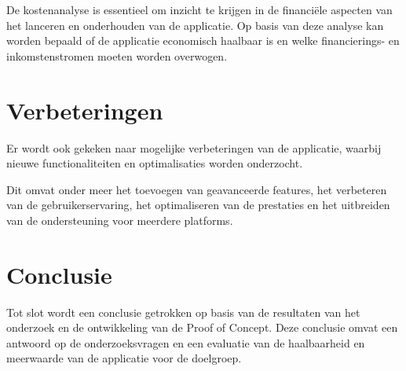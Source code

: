 \vspace{1cm}


De kostenanalyse is essentieel om inzicht te krijgen in de financiële aspecten van het lanceren en onderhouden van de applicatie. 
Op basis van deze analyse kan worden bepaald of de applicatie economisch haalbaar is en welke financierings- en inkomstenstromen moeten worden overwogen.

\section{Verbeteringen}

Er wordt ook gekeken naar mogelijke verbeteringen van de applicatie, waarbij nieuwe functionaliteiten en optimalisaties worden onderzocht. 

Dit omvat onder meer het toevoegen van geavanceerde features, het verbeteren van de gebruikerservaring, het optimaliseren van de prestaties en het uitbreiden van de ondersteuning voor meerdere platforms. 

\section{Conclusie }

Tot slot wordt een conclusie getrokken op basis van de resultaten van het onderzoek en de ontwikkeling van de Proof of Concept. Deze conclusie omvat een antwoord op de onderzoeksvragen en een evaluatie van de haalbaarheid en meerwaarde van de applicatie voor de doelgroep.

